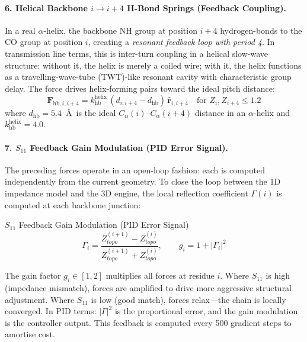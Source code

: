 \paragraph{6. Helical Backbone $i \to i{+}4$ H-Bond Springs (Feedback Coupling).}
In a real $\alpha$-helix, the backbone NH group at position $i{+}4$ hydrogen-bonds to the CO group at position $i$, creating a \emph{resonant feedback loop with period 4}. In transmission line terms, this is inter-turn coupling in a helical slow-wave structure: without it, the helix is merely a coiled wire; with it, the helix functions as a travelling-wave-tube (TWT)-like resonant cavity with characteristic group delay. The force drives helix-forming pairs toward the ideal pitch distance:
\begin{equation}
    \mathbf{F}_{\text{hb},i,i+4} = k_{\text{hb}}^{\text{helix}} \, (d_{i,i+4} - d_{\text{hb}}) \, \hat{\mathbf{r}}_{i,i+4} \quad \text{for } Z_i, Z_{i+4} \leq 1.2
    \label{eq:helix_hbond}
\end{equation}
where $d_{\text{hb}} = 5.4$~\AA\ is the ideal $C_\alpha(i)$--$C_\alpha(i{+}4)$ distance in an $\alpha$-helix and $k_{\text{hb}}^{\text{helix}} = 4.0$.

\paragraph{7. $S_{11}$ Feedback Gain Modulation (PID Error Signal).}
The preceding forces operate in an open-loop fashion: each is computed independently from the current geometry. To close the loop between the 1D impedance model and the 3D engine, the local reflection coefficient $\Gamma(i)$ is computed at each backbone junction:
\begin{resultbox}{$S_{11}$ Feedback Gain Modulation (PID Error Signal)}
\begin{equation}
    \Gamma_i = \frac{Z_{topo}^{(i+1)} - Z_{topo}^{(i)}}{Z_{topo}^{(i+1)} + Z_{topo}^{(i)}}, \qquad
    g_i = 1 + |\Gamma_i|^2
    \label{eq:s11_feedback}
\end{equation}
\end{resultbox}
The gain factor $g_i \in [1, 2]$ multiplies all forces at residue $i$. Where $S_{11}$ is high (impedance mismatch), forces are amplified to drive more aggressive structural adjustment. Where $S_{11}$ is low (good match), forces relax---the chain is locally converged. In PID terms: $|\Gamma|^2$ is the proportional error, and the gain modulation is the controller output. This feedback is computed every 500 gradient steps to amortise cost.

